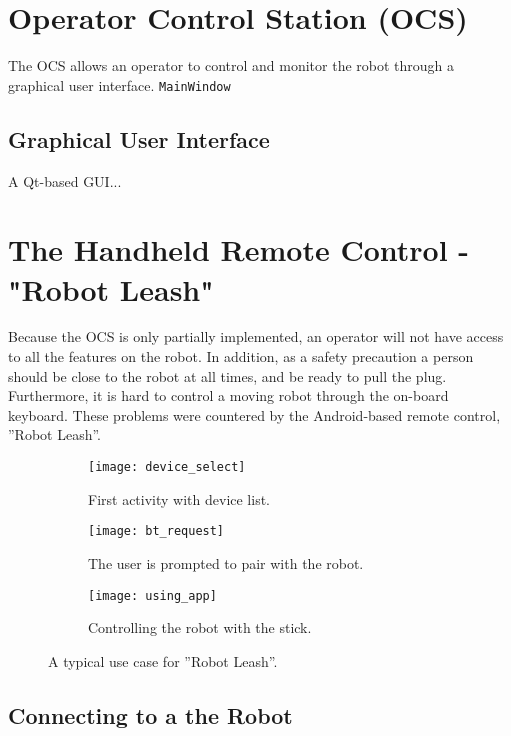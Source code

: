 \section{Operator Control Station (OCS)}

The \ac{OCS} allows an operator to control and monitor the robot through a graphical user interface. \texttt{MainWindow}

\subsection{Graphical User Interface}

A Qt-based \ac{GUI}...

\section{The Handheld Remote Control - "Robot Leash"}

Because the \ac{OCS} is only partially implemented, an operator will not have access to all the features on the robot. In addition, as a safety precaution a person should be close to the robot at all times, and be ready to pull the plug. Furthermore, it is hard to control a moving robot through the on-board keyboard. These problems were countered by the Android-based remote control, ''Robot Leash''. 


\begin{figure}
	\centering
	\begin{subfigure}[b]{0.30\textwidth}
		\texttt{[image: device\_select]}
		\caption{First activity with device list.}
		\label{fig:device_select}
	\end{subfigure}
		\begin{subfigure}[b]{0.30\textwidth}
			\texttt{[image: bt\_request]}
			\caption{The user is prompted to pair with the robot.}
			\label{fig:bt_request}
		\end{subfigure}
	\begin{subfigure}[b]{0.30\textwidth}
		\texttt{[image: using\_app]}
		\caption{Controlling the robot with the stick.}
		\label{fig:using_app}
	\end{subfigure}
	\caption{\label{fig:app_screens}A typical use case for ''Robot Leash''.}
\end{figure}

\subsection{Connecting to a the Robot}

